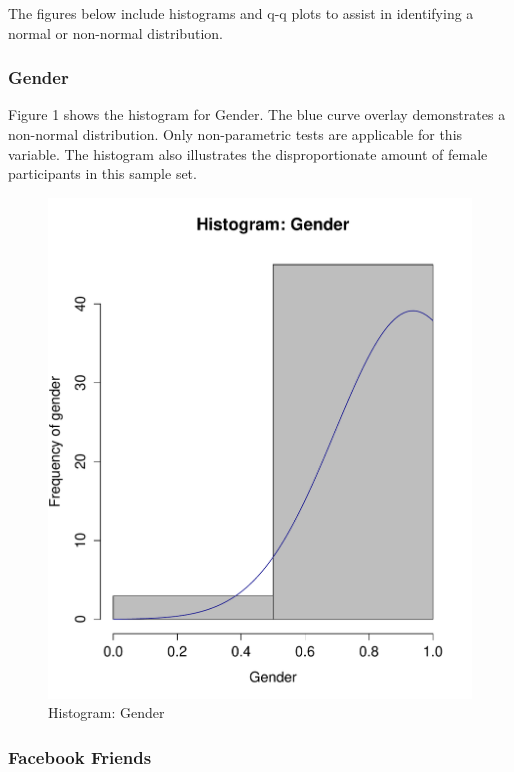 The figures below include histograms and q-q plots to assist in identifying a normal or non-normal distribution.

\subsubsection{Gender}

Figure 1 shows the histogram for Gender. The blue curve overlay demonstrates a non-normal distribution. Only non-parametric tests are applicable for this variable. The histogram also illustrates the disproportionate amount of female participants in this sample set.


\begin{figure}[H]
\centering
\caption{Histogram: Gender}
\includegraphics[scale=0.35]{./img/hist_gender.pdf}
\end{figure}

\subsubsection{Facebook Friends}

